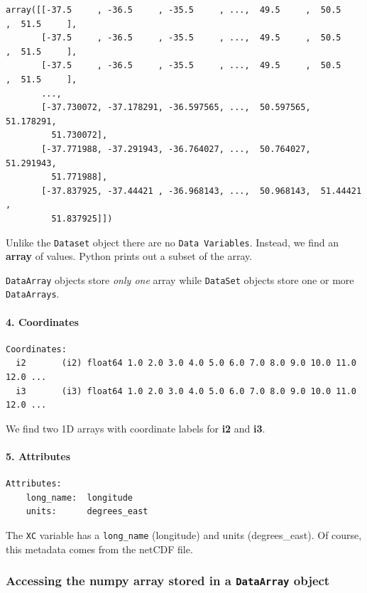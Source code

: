 \documentclass[11pt]{article}
\begin{document}
\begin{verbatim}
array([[-37.5     , -36.5     , -35.5     , ...,  49.5     ,  50.5     ,  51.5     ],
       [-37.5     , -36.5     , -35.5     , ...,  49.5     ,  50.5     ,  51.5     ],
       [-37.5     , -36.5     , -35.5     , ...,  49.5     ,  50.5     ,  51.5     ],
       ..., 
       [-37.730072, -37.178291, -36.597565, ...,  50.597565,  51.178291,
         51.730072],
       [-37.771988, -37.291943, -36.764027, ...,  50.764027,  51.291943,
         51.771988],
       [-37.837925, -37.44421 , -36.968143, ...,  50.968143,  51.44421 ,
         51.837925]])
\end{verbatim}

Unlike the \texttt{Dataset} object there are no
\texttt{Data\ Variables}. Instead, we find an \textbf{array} of values.
Python prints out a subset of the array.

\texttt{DataArray} objects store \emph{only one} array while
\texttt{DataSet} objects store one or more \texttt{DataArrays}.

\paragraph{4. Coordinates}\label{coordinates}

\begin{verbatim}
Coordinates:
  i2       (i2) float64 1.0 2.0 3.0 4.0 5.0 6.0 7.0 8.0 9.0 10.0 11.0 12.0 ...
  i3       (i3) float64 1.0 2.0 3.0 4.0 5.0 6.0 7.0 8.0 9.0 10.0 11.0 12.0 ...
\end{verbatim}

We find two 1D arrays with coordinate labels for \textbf{i2} and
\textbf{i3}.

\paragraph{5. Attributes}\label{attributes}

\begin{verbatim}
Attributes:
    long_name:  longitude
    units:      degrees_east
\end{verbatim}

The \texttt{XC} variable has a \texttt{long\_name} (longitude) and units
(degrees\_east). Of course, this metadata comes from the netCDF file.

    \subsubsection{\texorpdfstring{Accessing the numpy array stored in a
\texttt{DataArray}
object}{Accessing the numpy array stored in a DataArray object}}\label{accessing-the-numpy-array-stored-in-a-dataarray-object}
\end{document}
